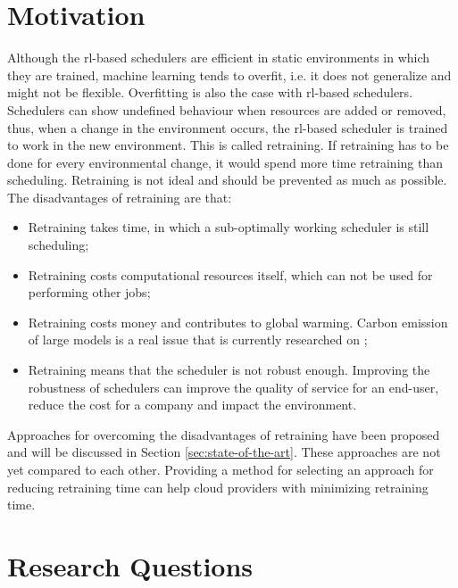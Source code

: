 \section{Motivation}

Although the \gls{rl}-based schedulers are efficient in static environments in which
they are trained, machine learning tends to overfit, i.e. it does not
generalize and might not be flexible. Overfitting is also the case with
\gls{rl}-based schedulers. Schedulers can show undefined behaviour when resources
are added or removed, thus, when a change in the environment occurs, the \gls{rl}-based
scheduler is trained to work in the new environment. This is called
retraining. If retraining has to
be done for every environmental change, it would spend more time retraining than
scheduling. Retraining is not ideal and should be prevented as much as
possible. The disadvantages of retraining are that:
\begin{itemize}[noitemsep]
    \item Retraining takes time, in which a sub-optimally working scheduler is
        still scheduling;
    \item Retraining costs computational resources itself, which can not be used
        for performing other jobs;
    \item Retraining costs money and contributes to global warming. Carbon
        emission of large \ml models is a real issue that is currently
        researched on \cite{patterson2021};
    \item Retraining means that the scheduler is not robust enough. Improving the
        robustness of schedulers can improve the quality of service for an
        end-user, reduce the cost for a company and impact the environment.
\end{itemize}
Approaches for overcoming the disadvantages of retraining have been proposed
and will be discussed in Section \ref{sec:state-of-the-art}.
These approaches are not yet compared to each other. Providing a method for
selecting an approach for reducing retraining time can help cloud providers with
minimizing retraining time.


\section{Research Questions}

